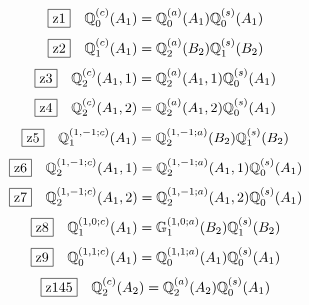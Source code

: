 \documentclass[fleqn,10pt,landscape]{jsarticle}
\begin{document}
\begin{dmath*}
\hspace*{3mm}\fbox{z1}\quad \mathbb{Q}_{0}^{(c)}(A_{1})=\mathbb{Q}_{0}^{(a)}(A_{1}) \mathbb{Q}_{0}^{(s)}(A_{1})
\end{dmath*}
\begin{dmath*}
\hspace*{3mm}\fbox{z2}\quad \mathbb{Q}_{1}^{(c)}(A_{1})=\mathbb{Q}_{2}^{(a)}(B_{2}) \mathbb{Q}_{1}^{(s)}(B_{2})
\end{dmath*}
\begin{dmath*}
\hspace*{3mm}\fbox{z3}\quad \mathbb{Q}_{2}^{(c)}(A_{1},1)=\mathbb{Q}_{2}^{(a)}(A_{1},1) \mathbb{Q}_{0}^{(s)}(A_{1})
\end{dmath*}
\begin{dmath*}
\hspace*{3mm}\fbox{z4}\quad \mathbb{Q}_{2}^{(c)}(A_{1},2)=\mathbb{Q}_{2}^{(a)}(A_{1},2) \mathbb{Q}_{0}^{(s)}(A_{1})
\end{dmath*}
\begin{dmath*}
\hspace*{3mm}\fbox{z5}\quad \mathbb{Q}_{1}^{(1,-1;c)}(A_{1})=\mathbb{Q}_{2}^{(1,-1;a)}(B_{2}) \mathbb{Q}_{1}^{(s)}(B_{2})
\end{dmath*}
\begin{dmath*}
\hspace*{3mm}\fbox{z6}\quad \mathbb{Q}_{2}^{(1,-1;c)}(A_{1},1)=\mathbb{Q}_{2}^{(1,-1;a)}(A_{1},1) \mathbb{Q}_{0}^{(s)}(A_{1})
\end{dmath*}
\begin{dmath*}
\hspace*{3mm}\fbox{z7}\quad \mathbb{Q}_{2}^{(1,-1;c)}(A_{1},2)=\mathbb{Q}_{2}^{(1,-1;a)}(A_{1},2) \mathbb{Q}_{0}^{(s)}(A_{1})
\end{dmath*}
\begin{dmath*}
\hspace*{3mm}\fbox{z8}\quad \mathbb{Q}_{1}^{(1,0;c)}(A_{1})=\mathbb{G}_{1}^{(1,0;a)}(B_{2}) \mathbb{Q}_{1}^{(s)}(B_{2})
\end{dmath*}
\begin{dmath*}
\hspace*{3mm}\fbox{z9}\quad \mathbb{Q}_{0}^{(1,1;c)}(A_{1})=\mathbb{Q}_{0}^{(1,1;a)}(A_{1}) \mathbb{Q}_{0}^{(s)}(A_{1})
\end{dmath*}
\begin{dmath*}
\hspace*{3mm}\fbox{z145}\quad \mathbb{Q}_{2}^{(c)}(A_{2})=\mathbb{Q}_{2}^{(a)}(A_{2}) \mathbb{Q}_{0}^{(s)}(A_{1})
\end{dmath*}
\end{document}
